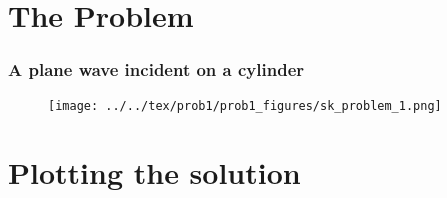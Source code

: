 \section{The Problem}
%
\begin{frame}[c]
  \frametitle{A plane wave incident on a cylinder}
    \begin{figure}
      \texttt{[image: ../../tex/prob1/prob1\_figures/sk\_problem\_1.png]}
    \end{figure}
\end{frame}
%
\section{Plotting the solution}

